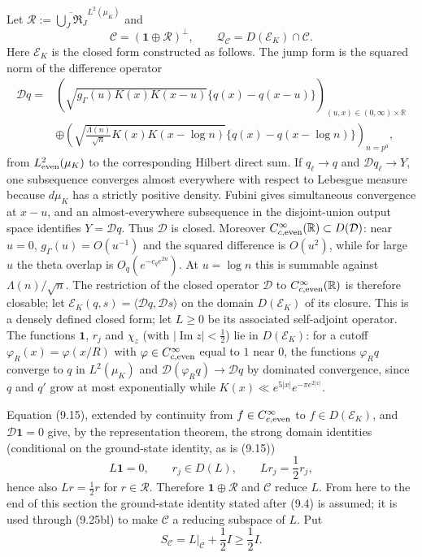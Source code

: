 \documentclass[11pt]{amsart}
\theoremstyle{definition}
\theoremstyle{remark}
\begin{document}
Let \(\mathcal R:=\overline{\bigcup_J\mathfrak R_J}^{L^2(\mu_K)}\) and
\[
 \mathscr C=(\mathbf1\oplus\mathcal R)^\perp,
 \qquad
 \mathcal Q_{\mathscr C}=D(\mathscr E_K)\cap\mathscr C.
\tag{9.25bj}
\]
Here \(\mathscr E_K\) is the closed form constructed as follows.  The
jump form is the squared norm of the difference operator
\[
\begin{aligned}
 \mathcal Dq={}&
 \left(
 \sqrt{g_\Gamma(u)K(x)K(x-u)}\{q(x)-q(x-u)\}
 \right)_{(u,x)\in(0,\infty)\times\mathbb R}
 \\
 &\oplus
 \left(
 \sqrt{\frac{\Lambda(n)}{\sqrt n}K(x)K(x-\log n)}
 \{q(x)-q(x-\log n)\}
 \right)_{n=p^a},
\end{aligned}
\tag{9.25bk}
\]
from \(L^2_{\rm even}(\mu_K)\) to the corresponding Hilbert direct sum.
If \(q_\ell\to q\) and \(\mathcal Dq_\ell\to Y\), one subsequence converges
almost everywhere with respect to Lebesgue measure because \(d\mu_K\) has
a strictly positive density.  Fubini gives simultaneous convergence at
\(x-u\), and an almost-everywhere subsequence in the disjoint-union output
space identifies \(Y=\mathcal Dq\).  Thus \(\mathcal D\) is closed.
Moreover \(C_{c,\rm even}^\infty(\mathbb R)\subset D(\mathcal D)\): near
\(u=0\), \(g_\Gamma(u)=O(u^{-1})\) and the squared difference is \(O(u^2)\),
while for large \(u\) the theta overlap is \(O_q(e^{-c_qe^{2u}})\).
At \(u=\log n\) this is summable against
\(\Lambda(n)/\sqrt n\).  The restriction of the closed operator
\(\mathcal D\) to \(C_{c,\rm even}^\infty(\mathbb R)\) is therefore
closable; let \(\mathscr E_K(q,s)=\langle\mathcal Dq,\mathcal Ds\rangle\)
on the domain \(D(\mathscr E_K)\) of its closure.  This is a densely
defined closed form; let \(L\ge0\) be its associated self-adjoint
operator.  The functions \(\mathbf1\), \(r_j\) and \(\chi_z\) (with
\(\lvert\operatorname{Im}z\rvert<\frac12\)) lie in \(D(\mathscr E_K)\):
for a cutoff \(\varphi_R(x)=\varphi(x/R)\) with \(\varphi\in
C_{c,\rm even}^\infty\) equal to \(1\) near \(0\), the functions
\(\varphi_Rq\) converge to \(q\) in \(L^2(\mu_K)\) and
\(\mathcal D(\varphi_Rq)\to\mathcal Dq\) by dominated convergence,
since \(q\) and \(q'\) grow at most exponentially while
\(K(x)\ll e^{5|x|}e^{-\pi e^{2|x|}}\).

Equation (9.15), extended by continuity from
\(f\in C_{c,\rm even}^\infty\) to \(f\in D(\mathscr E_K)\), and
\(\mathcal D\mathbf1=0\) give, by the representation theorem, the strong
domain identities (conditional on the ground-state identity, as is
(9.15))
\[
 L\mathbf1=0,
 \qquad
 r_j\in D(L),\qquad Lr_j=\frac12r_j,
\tag{9.25bl}
\]
hence also \(Lr=\frac12r\) for \(r\in\mathcal R\).  Therefore \(\mathbf1\oplus\mathcal R\) and \(\mathscr C\) reduce \(L\).
From here to the end of this section the ground-state identity stated
after (9.4) is assumed; it is used through (9.25bl) to make
\(\mathscr C\) a reducing subspace of \(L\).  Put
\[
 S_{\mathscr C}=L|_{\mathscr C}+\frac12I\ge\frac12I.
\tag{9.25bm}
\]
\end{document}

